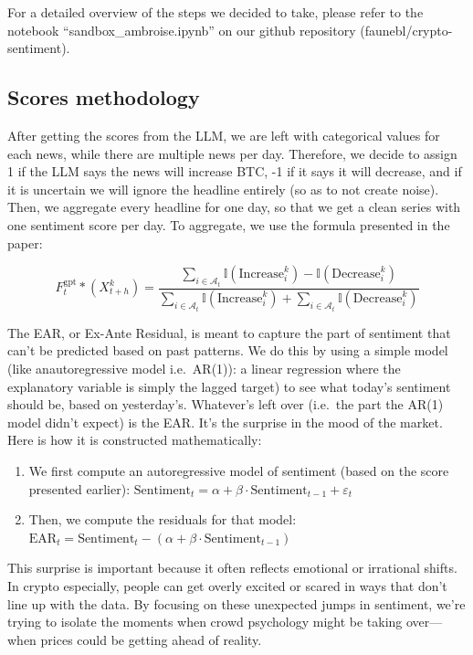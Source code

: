 \documentclass[
  a4paper]{article}
\begin{document}
For a detailed overview of the steps we decided to take, please refer to
the notebook ``sandbox\_ambroise.ipynb'' on our github repository
(faunebl/crypto-sentiment).

\hypertarget{scores-methodology}{%
\subsection{Scores methodology}\label{scores-methodology}}

After getting the scores from the LLM, we are left with categorical
values for each news, while there are multiple news per day. Therefore,
we decide to assign 1 if the LLM says the news will increase BTC, -1 if
it says it will decrease, and if it is uncertain we will ignore the
headline entirely (so as to not create noise). Then, we aggregate every
headline for one day, so that we get a clean series with one sentiment
score per day. To aggregate, we use the formula presented in the paper:

\[
F^\text{gpt}_t *(X^k_{t+h}) = \frac{\sum_{i \in \mathcal{A}_t} \mathbb{I}(\text{Increase}^k_i) - \mathbb{I}(\text{Decrease}^k_i)}{\sum_{i \in \mathcal{A}_t} \mathbb{I}(\text{Increase}^k_i) + \sum_{i \in \mathcal{A}_t} \mathbb{I}(\text{Decrease}^k_i)}
\]

The EAR, or Ex-Ante Residual, is meant to capture the part of sentiment
that can't be predicted based on past patterns. We do this by using a
simple model (like anautoregressive model i.e.~AR(1)): a linear
regression where the explanatory variable is simply the lagged target)
to see what today's sentiment should be, based on yesterday's.
Whatever's left over (i.e.~the part the AR(1) model didn't expect) is
the EAR. It's the surprise in the mood of the market. Here is how it is
constructed mathematically:

\begin{enumerate}
\def\labelenumi{\arabic{enumi}.}
\item
  We first compute an autoregressive model of sentiment (based on the
  score presented earlier):
  \(\text{Sentiment}_t = \alpha + \beta \cdot \text{Sentiment}_{t-1} + \varepsilon_t\)
\item
  Then, we compute the residuals for that model:
  \(\text{EAR}_t = \text{Sentiment}_t - (\alpha + \beta \cdot \text{Sentiment}_{t-1})\)
\end{enumerate}

This surprise is important because it often reflects emotional or
irrational shifts. In crypto especially, people can get overly excited
or scared in ways that don't line up with the data. By focusing on these
unexpected jumps in sentiment, we're trying to isolate the moments when
crowd psychology might be taking over---when prices could be getting
ahead of reality.
\end{document}
